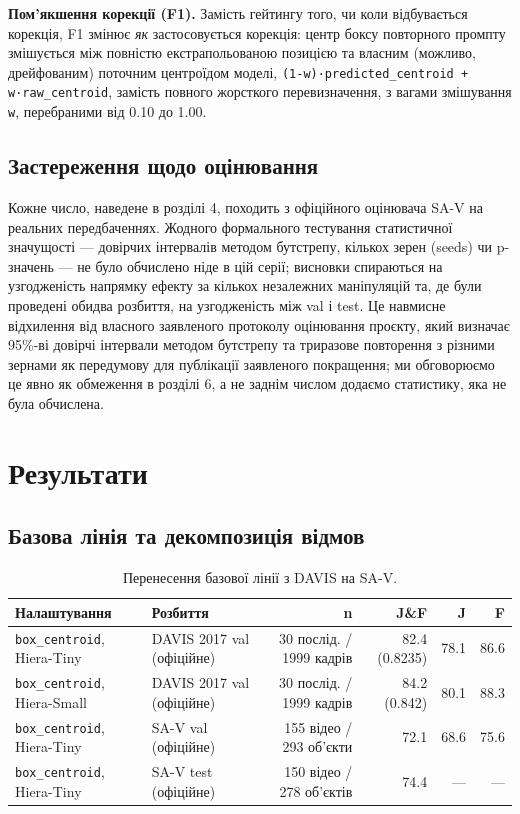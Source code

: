 \documentclass[11pt]{article}
\begin{document}
\textbf{Пом'якшення корекції (F1).} Замість гейтингу того, чи коли відбувається корекція, F1 змінює \emph{як} застосовується корекція: центр боксу повторного промпту змішується між повністю екстрапольованою позицією та власним (можливо, дрейфованим) поточним центроїдом моделі, \texttt{(1-w)·predicted\_centroid + w·raw\_centroid}, замість повного жорсткого перевизначення, з вагами змішування \texttt{w}, перебраними від 0.10 до 1.00.

\subsection{Застереження щодо оцінювання}

Кожне число, наведене в розділі 4, походить з офіційного оцінювача SA-V на реальних передбаченнях. Жодного формального тестування статистичної значущості --- довірчих інтервалів методом бутстрепу, кількох зерен (seeds) чи p-значень --- не було обчислено ніде в цій серії; висновки спираються на узгодженість напрямку ефекту за кількох незалежних маніпуляцій та, де були проведені обидва розбиття, на узгодженість між val і test. Це навмисне відхилення від власного заявленого протоколу оцінювання проєкту, який визначає 95\%-ві довірчі інтервали методом бутстрепу та триразове повторення з різними зернами як передумову для публікації заявленого покращення; ми обговорюємо це явно як обмеження в розділі 6, а не заднім числом додаємо статистику, яка не була обчислена.

\section{Результати}

\subsection{Базова лінія та декомпозиція відмов}

\begin{table}[!htbp]
\centering
\caption{Перенесення базової лінії з DAVIS на SA-V.}
\label{tab:1}
\small
\begin{tabularx}{\textwidth}{@{}LLRrrr@{}}
\toprule
Налаштування & Розбиття & n & J\&F & J & F \\
\midrule
\texttt{box\_centroid}, Hiera-Tiny & DAVIS 2017 val (офіційне) & 30 послід. / 1999 кадрів & 82.4 (0.8235) & 78.1 & 86.6 \\
\texttt{box\_centroid}, Hiera-Small & DAVIS 2017 val (офіційне) & 30 послід. / 1999 кадрів & 84.2 (0.842) & 80.1 & 88.3 \\
\texttt{box\_centroid}, Hiera-Tiny & SA-V val (офіційне) & 155 відео / 293 об'єкти & 72.1 & 68.6 & 75.6 \\
\texttt{box\_centroid}, Hiera-Tiny & SA-V test (офіційне) & 150 відео / 278 об'єктів & 74.4 & --- & --- \\
\bottomrule
\end{tabularx}
\end{table}
\end{document}
